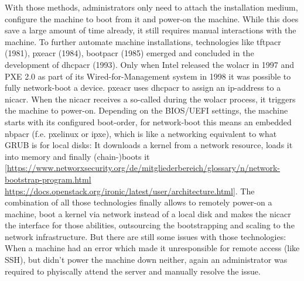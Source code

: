 \newline
With those methods, administrators only need to attach the installation medium, configure the machine to boot from it and power-on the machine. While this does save a large amount of time already, it still requires manual interactions with the machine.
\newline
To further automate machine installations, technologies like \gls{tftpacr} (1981), \gls{pxeacr} (1984), \gls{bootpacr} (1985) emerged and concluded in the development of \gls{dhcpacr} (1993). Only when Intel released the \gls{wolacr} in 1997 and PXE 2.0 as part of its Wired-for-Management system in 1998 it was possible to fully network-boot a device.
\newline
\Gls{pxeacr} uses \gls{dhcpacr} to assign an ip-address to a \gls{nicacr}. When the \gls{nicacr} receives a so-called  during the \gls{wolacr} process, it triggers the machine to power-on. Depending on the BIOS/UEFI settings, the machine starts with its configured boot-order, for network-boot this means an embedded \gls{nbpacr} (f.e. pxelinux or ipxe), which is like a networking equivalent to what GRUB is for local disks: It downloads a kernel from a network resource, loads it into memory and finally (chain-)boots it [\url{https://www.networxsecurity.org/de/mitgliederbereich/glossary/n/network-bootstrap-program.html} \url{https://docs.openstack.org/ironic/latest/user/architecture.html}].
\newline
The combination of all those technologies finally allows to remotely power-on a machine, boot a kernel via network instead of a local disk and makes the \gls{nicacr} the interface for those abilities, outsourcing the bootstrapping and scaling to the network infrastructure.
\newline
But there are still some issues with those technologies: \\
When a machine had an error which made it unresponsible for remote access (like SSH), but didn't power the machine down neither, again an administrator was required to phyiscally attend the server and manually resolve the issue.
\newline

